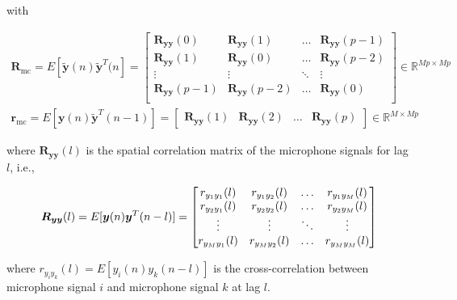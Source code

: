 \noindent
with

\begin{eqnarray}
	\boldsymbol{R}_{\mathrm{mc}} = E[\boldsymbol{\tilde{y}}(n) \boldsymbol{\tilde{y}}^T(n] = 
	\begin{bmatrix}
		\boldsymbol{R}_{\boldsymbol{yy}}(0)     & \boldsymbol{R}_{\boldsymbol{yy}}(1)    & \dots   & \boldsymbol{R}_{\boldsymbol{yy}}(p-1)  \\
		\boldsymbol{R}_{\boldsymbol{yy}}(1)      & \boldsymbol{R}_{\boldsymbol{yy}}(0)      & \dots   & \boldsymbol{R}_{\boldsymbol{yy}}(p-2) \\
		\vdots                               & \vdots                               & \ddots & \vdots \\
		\boldsymbol{R}_{\boldsymbol{yy}}(p-1) & \boldsymbol{R}_{\boldsymbol{yy}}(p-2)  & \dots   & \boldsymbol{R}_{\boldsymbol{yy}}(0) \\
	\end{bmatrix}  \in  \mathbb{R} ^ {Mp \times Mp} \\
	\boldsymbol{r}_{\mathrm{mc}} = E[\boldsymbol{y}(n)\boldsymbol{\tilde{y}}^T(n-1)] = 
	\begin{bmatrix}
		\boldsymbol{R}_{\boldsymbol{yy}}(1)     & \boldsymbol{R}_{\boldsymbol{yy}}(2)     & \dots   & \boldsymbol{R}_{\boldsymbol{yy}}(p) 
	\end{bmatrix} \in  \mathbb{R} ^ {M \times Mp}
\end{eqnarray}

\noindent
where $\boldsymbol{R}_{\boldsymbol{yy}}(l)$ is the spatial correlation matrix of the microphone signals for lag $l$, i.e., 


\begin{equation}
	\boldsymbol{R}_{\boldsymbol{yy}}(l) = E[\boldsymbol{y}(n) \boldsymbol{y}^T(n-l)] = 
	\begin{bmatrix} 
		r_{y_1y_1}(l)   & r_{y_1y_2}(l)  & \dots   & r_{y_1y_M}(l) \\
		r_{y_2y_1}(l)   & r_{y_2y_2}(l)& \dots    & r_{y_2y_M}(l)  \\
		\vdots     & \vdots      & \ddots  & \vdots  \\
		r_{y_My_1}(l)  & r_{y_My_2}(l) & \dots    & r_{y_My_M}(l) \\
	\end{bmatrix} \\
\end{equation}

\noindent
where $r_{y_i y_k}(l)=E[y_i(n) y_k(n-l)]$ is the cross-correlation between microphone signal $i$ and microphone signal $k$ at lag $l$. 

